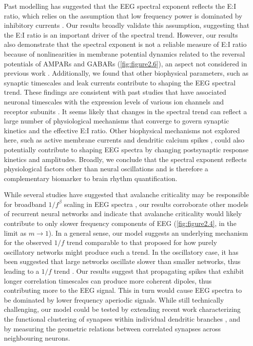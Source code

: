 Past modelling has suggested that the EEG spectral exponent reflects the E:I ratio, which relies on the assumption that low frequency power is dominated by inhibitory currents \cite{Gao2017}. Our results broadly validate this assumption, suggesting that the E:I ratio is an important driver of the spectral trend. However, our results also demonstrate that the spectral exponent is not a reliable measure of E:I ratio because of nonlinearities in membrane potential dynamics related to the reversal potentials of AMPARs and GABARs (\autoref{fig:figure2.6}), an aspect not considered in previous work \cite{Gao2017}. Additionally, we found that other biophysical parameters, such as synaptic timescales and leak currents contribute to shaping the EEG spectral trend. These findings are consistent with past studies that have associated neuronal timescales with the expression levels of various ion channels and receptor subunits \cite{Gao2020}. It seems likely that changes in the spectral trend can reflect a large number of physiological mechanisms that converge to govern synaptic kinetics and the effective E:I ratio. Other biophysical mechanisms not explored here, such as active membrane currents \cite{Reimann2013} and dendritic calcium spikes \cite{Suzuki2017}, could also potentially contribute to shaping EEG spectra by changing postsynaptic response kinetics and amplitudes. Broadly, we conclude that the spectral exponent reflects physiological factors other than neural oscillations and is therefore a complementary biomarker to brain rhythm quantification.

While several studies have suggested that avalanche criticality may be responsible for broadband $1/f^\beta$ scaling in EEG spectra \cite{Beggs2003, He2014, Lombardi2017, Petermann2009}, our results corroborate other models of recurrent neural networks \cite{Chaudhuri2018} and indicate that avalanche criticality would likely contribute to only slower frequency components of EEG (\autoref{fig:figure2.4}, in the limit as $m\rightarrow 1$). In a general sense, our model suggests an underlying mechanism for the observed $1/f$ trend comparable to that proposed for how purely oscillatory networks might produce such a trend. In the oscillatory case, it has been suggested that large networks oscillate slower than smaller networks, thus leading to a $1/f$ trend \cite{Buzsaki2004, Buzsaki2023}. Our results suggest that propagating spikes that exhibit longer correlation timescales can produce more coherent dipoles, thus contributing more to the EEG signal. This in turn would cause EEG spectra to be dominated by lower frequency aperiodic signals. While still technically challenging, our model could be tested by extending recent work characterizing the functional clustering of synapses within individual dendritic branches \cite{Iacaruso2017, Ju2020, Kerlin2019, Lafourcade2022}, and by measuring the geometric relations between correlated synapses across neighbouring neurons.

